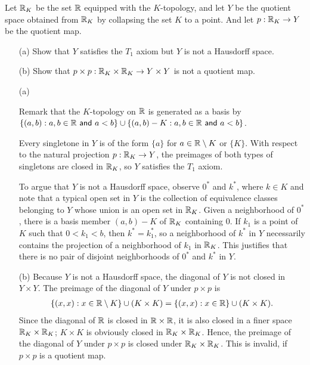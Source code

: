 \begin{prob}\label{the product of quotient maps need not be a quotient map}
    Let ${\mathbb{R}}_K$ be the set ${\mathbb{R}}$ equipped with the $K$-topology, and let $Y$ be the quotient space obtained from ${\mathbb{R}}_K$ by collapsing the set $K$ to a point.
    And let $p: {\mathbb{R}}_K\rightarrow Y$ be the quotient map.
    \begin{enumerate}
        \item[(a)]
        {
            Show that $Y$ satisfies the $T_1$ axiom but $Y$ is not a Hausdorff space.
        }
        \item[(b)]
        {
            Show that $p\times p: {\mathbb{R}}_K\times{\mathbb{R}}_K\rightarrow Y\times Y$ is not a quotient map.
        }
    \end{enumerate}
\end{prob}
\begin{sol}
    \begin{enumerate}
        \item[(a)]
        {
            Remark that the $K$-topology on ${\mathbb{R}}$ is generated as a basis by $\{(a, b): \textsf{$a, b\in{\mathbb{R}}$ and $a<b$}\}\cup\{(a, b)-K: \textsf{$a, b\in{\mathbb{R}}$ and $a<b$}\}$.

            Every singletone in $Y$ is of the form $\{a\}$ for $a\in{\mathbb{R}}\setminus K$ or $\{K\}$.
            With respect to the natural projection $p: {\mathbb{R}}_K\rightarrow Y$, the preimages of both types of singletons are closed in ${\mathbb{R}}_K$, so $Y$ satisfies the $T_1$ axiom.

            To argue that $Y$ is not a Hausdorff space, observe $0^*$ and $k^*$, where $k\in K$ and note that a typical open set in $Y$ is the collection of equivalence classes belonging to $Y$ whose union is an open set in ${\mathbb{R}}_K$.
            Given a neighborhood of $0^*$, there is a basis member $(a, b)-K$ of ${\mathbb{R}}_K$ containing $0$.
            If $k_1$ is a point of $K$ such that $0<k_1<b$, then $k^*=k_1^*$, so a neighborhood of $k^*$ in $Y$ necessarily contains the projection of a neighborhood of $k_1$ in ${\mathbb{R}}_K$.
            This justifies that there is no pair of disjoint neighborhoods of $0^*$ and $k^*$ in $Y$.
        }
        \item[(b)]
        {
            Because $Y$ is not a Hausdorff space, the diagonal of $Y$ is not closed in $Y\times Y$.
            The preimage of the diagonal of $Y$ under $p\times p$ is
            \begin{align*}
                \{(x, x): x\in{\mathbb{R}}\setminus K\}\cup (K\times K)=\{(x, x): x\in{\mathbb{R}}\}\cup (K\times K).
            \end{align*}
            Since the diagonal of ${\mathbb{R}}$ is closed in ${\mathbb{R}}\times{\mathbb{R}}$, it is also closed in a finer space ${\mathbb{R}}_K\times{\mathbb{R}}_K$; $K\times K$ is obviously closed in ${\mathbb{R}}_K\times{\mathbb{R}}_K$.
            Hence, the preimage of the diagonal of $Y$ under $p\times p$ is closed under ${\mathbb{R}}_K\times{\mathbb{R}}_K$.
            This is invalid, if $p\times p$ is a quotient map.
        }
    \end{enumerate}
\end{sol}